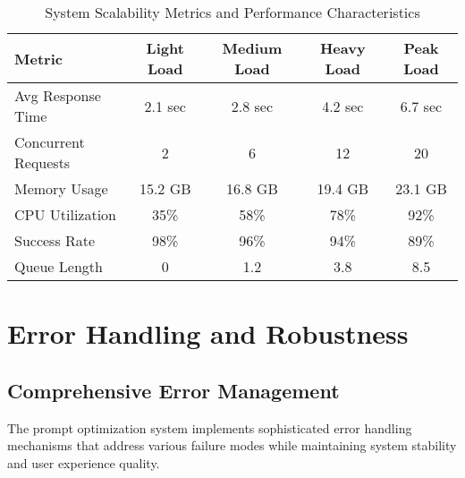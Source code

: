 \begin{table}[H]
\begin{table}[H]
[Placeholder for Figure 5.6: Scalability Performance Charts showing processing time vs. input complexity and concurrent request handling capacity]

\begin{table}[H]
\centering
\caption{System Scalability Metrics and Performance Characteristics}
\label{tab:scalability_metrics}
{\begin{tabular}{lcccc}
\toprule
\textbf{Metric} & \textbf{Light Load} & \textbf{Medium Load} & \textbf{Heavy Load} & \textbf{Peak Load} \\
\midrule
Avg Response Time & 2.1 sec & 2.8 sec & 4.2 sec & 6.7 sec \\
Concurrent Requests & 2 & 6 & 12 & 20 \\
Memory Usage & 15.2 GB & 16.8 GB & 19.4 GB & 23.1 GB \\
CPU Utilization & 35\% & 58\% & 78\% & 92\% \\
Success Rate & 98\% & 96\% & 94\% & 89\% \\
Queue Length & 0 & 1.2 & 3.8 & 8.5 \\
\bottomrule
\end{tabular}}
\end{table}

\section{Error Handling and Robustness}

\subsection{Comprehensive Error Management}

The prompt optimization system implements sophisticated error handling mechanisms that address various failure modes while maintaining system stability and user experience quality.


\end{table}
\end{table}
